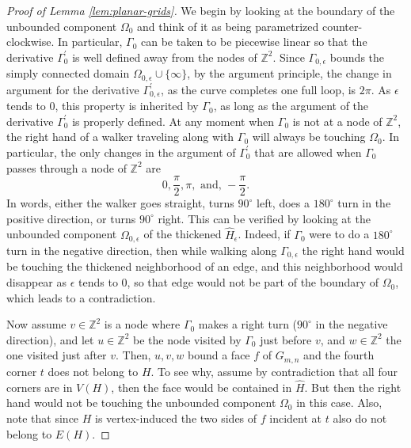 \documentclass[preprint,12pt]{elsarticle}
\theoremstyle{definition}
\theoremstyle{remark}
\numberwithin{equation}{section}
\newcommand{\Z}{\mathbb{Z}}
\newcommand{\ep}{\epsilon }
\newcommand{\Ga}{\Gamma }
\newcommand{\Om}{\Omega }
\begin{document}
\begin{proof}[Proof of Lemma \ref{lem:planar-grids}]
We begin by looking at the boundary of the unbounded component $\Om_0$ and think of it as being parametrized counter-clockwise. In particular, $\Ga_0$ can be taken to be piecewise linear so that the derivative $\Ga_0^\prime$ is well defined away from the nodes of $\Z^2$.
Since $\Ga_{0,\ep}$ bounds the simply connected domain $\Om_{0,\ep}\cup \{\infty\}$, by the argument principle, the change in argument for the derivative $\Ga_{0,\ep}^\prime$, as the curve completes one full loop, is $2\pi$. As $\ep$ tends to $0$, this property is inherited by $\Ga_0$, as long as the argument of the derivative $\Ga_0^\prime$ is properly defined.
At any moment when $\Ga_0$ is not at a node of $\Z^2$, the right hand of a walker traveling along with $\Ga_0$ will always be touching $\Om_0$. In particular, the only changes in the argument of $\Ga_0^\prime$ that are allowed when $\Ga_0$ passes through a node of $\Z^2$ are 
\[
0,\frac{\pi}{2},\pi,\text{ and, }-\frac{\pi}{2}.
\]
In words, either the walker goes straight, turns $90^\circ$ left, does a $180^\circ$ turn in the positive direction, or turns $90^\circ$ right. This can be verified by looking at the unbounded component $\Om_{0,\ep}$ of the thickened $\hat{H}_\ep$. Indeed, if $\Ga_0$ were to do a $180^\circ$ turn in the negative direction, then while walking along $\Ga_{0,\ep}$ the right hand would be touching the thickened neighborhood of an edge, and this neighborhood would disappear as $\ep$ tends to $0$, so that edge would not be part of the boundary of $\Om_0$, which leads to a contradiction. 

Now assume $v\in \Z^2$ is a node where $\Ga_0$ makes a right turn ($90^\circ$  in the negative direction), and let $u\in\Z^2$ be the node visited by $\Ga_0$ just before $v$, and $w\in\Z^2$ the one visited just after $v$.
Then, $u,v,w$ bound a face $f$ of $G_{m,n}$ and the fourth corner $t$ does not belong to $H$. To see why, assume by contradiction that all four corners are in $V(H)$, then the face would be contained in $\hat{H}$. But then the right hand would not be touching the unbounded component $\Om_0$ in this case.
Also, note that since $H$ is vertex-induced the two sides of $f$ incident at $t$ also do not belong to $E(H)$. 


\end{proof}
\end{document}
